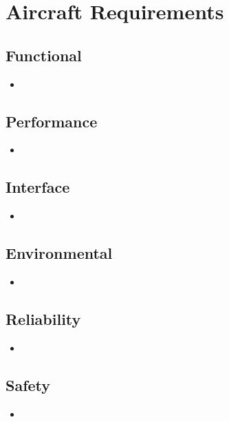 \chapter{Aircraft Requirements}\label{cp:aircraft_reqs}

\section{Functional}\label{sec:functional}

\begin{itemize}
    \item 
\end{itemize}

\section{Performance}\label{sec:performance}

\begin{itemize}
    \item 
\end{itemize}

\section{Interface}\label{sec:interface}

\begin{itemize}
    \item 
\end{itemize}

\section{Environmental}\label{sec:environmental}

\begin{itemize}
    \item 
\end{itemize}

\section{Reliability}\label{sec:reliability}

\begin{itemize}
    \item 
\end{itemize}

\section{Safety}\label{sec:safety}

\begin{itemize}
    \item 
\end{itemize}
